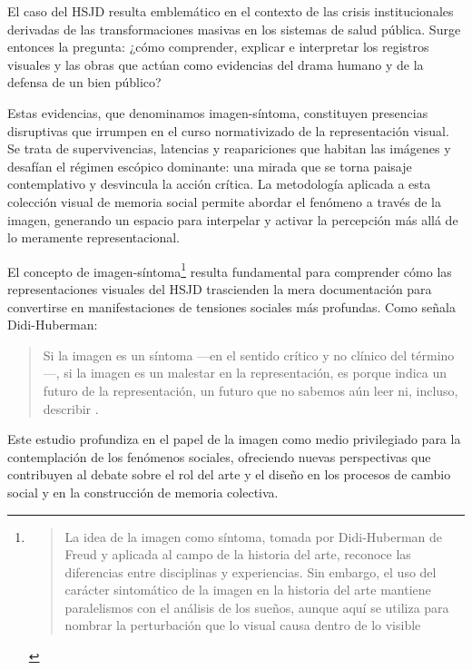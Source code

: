 El caso del HSJD resulta emblemático en el contexto de las crisis institucionales derivadas de las transformaciones masivas en los sistemas de salud pública. Surge entonces la pregunta: ¿cómo comprender, explicar e interpretar los registros visuales y las obras que actúan como evidencias del drama humano y de la defensa de un bien público?

\textcolor{edit30sept}{Estas evidencias, que denominamos imagen-síntoma, constituyen presencias disruptivas que irrumpen en el curso normativizado de la representación visual. Se trata de supervivencias, latencias y reapariciones que habitan las imágenes y desafían el régimen escópico dominante: una mirada que se torna paisaje contemplativo y desvincula la acción crítica. La metodología aplicada a esta colección visual de memoria social permite abordar el fenómeno a través de la imagen, generando un espacio para interpelar y activar la percepción más allá de lo meramente representacional.}

El concepto de imagen-síntoma\footnote{\begin{quote}La idea de la imagen como síntoma, tomada por Didi-Huberman de Freud y aplicada al campo de la historia del arte, reconoce las diferencias entre disciplinas y experiencias. Sin embargo, el uso del carácter sintomático de la imagen en la historia del arte mantiene paralelismos con el análisis de los sueños, aunque aquí se utiliza para nombrar la perturbación que lo visual causa dentro de lo visible \parencite[p. 37]{VegaArevalo2017}\end{quote}} resulta fundamental para comprender cómo las representaciones visuales del HSJD trascienden la mera documentación para convertirse en manifestaciones de tensiones sociales más profundas. Como señala Didi-Huberman:

\begin{quote}
Si la imagen es un síntoma —en el sentido crítico y no clínico del término—, si la imagen es un malestar en la representación, es porque indica un futuro de la representación, un futuro que no sabemos aún leer ni, incluso, describir \parencite[p. 177]{DidiHuberman2011}.
\end{quote}

Este estudio profundiza en el papel de la imagen como medio privilegiado para la contemplación de los fenómenos sociales, ofreciendo nuevas perspectivas que contribuyen al debate sobre el rol del arte y el diseño en los procesos de cambio social y en la construcción de memoria colectiva.

